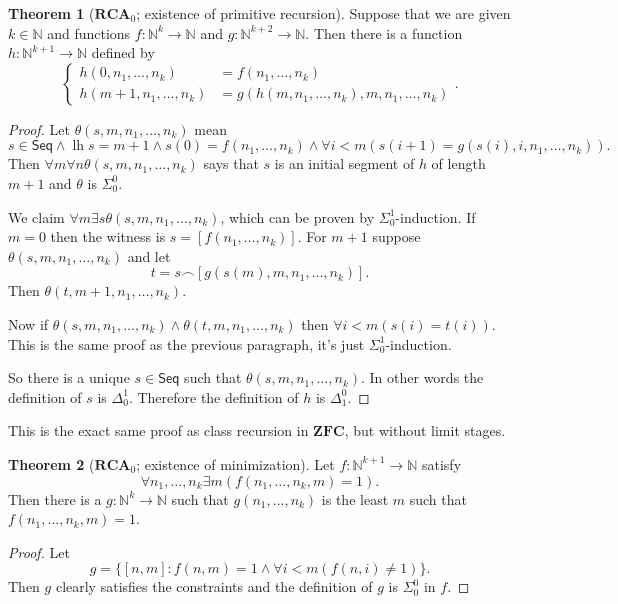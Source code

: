 \documentclass[12pt]{book}
\newcommand{\NN}{\mathbb{N}}
\newcommand{\Seq}{\mathsf{Seq}}
\DeclareMathOperator{\lh}{lh}
\newcommand{\RCA}{\mathbf{RCA}}
\theoremstyle{definition}
\newtheorem{theorem}{Theorem}[chapter]
\begin{document}
\begin{theorem}[$\RCA_0$; existence of primitive recursion]
Suppose that we are given $k \in \NN$ and functions $f: \NN^k \to \NN$ and $g: \NN^{k+2} \to \NN$.
Then there is a function $h: \NN^{k+1} \to \NN$ defined by
$$\begin{cases}
h(0, n_1, \dots, n_k) &= f(n_1, \dots, n_k) \\
h(m+1,n_1, \dots, n_k) &= g(h(m, n_1, \dots, n_k), m, n_1, \dots, n_k)
\end{cases}.$$
\end{theorem}
\begin{proof}
Let $\theta(s, m, n_1, \dots, n_k)$ mean
$$s \in \Seq \wedge \lh s = m + 1 \wedge s(0) = f(n_1, \dots, n_k) \wedge \forall i < m(s(i+1) = g(s(i), i, n_1, \dots, n_k)).$$
Then $\forall m \forall n \theta(s, m, n_1, \dots, n_k)$ says that $s$ is an initial segment of $h$ of length $m + 1$ and $\theta$ is $\Sigma_0^0$.

We claim $\forall m \exists s \theta(s, m, n_1, \dots, n_k)$, which can be proven by $\Sigma_0^1$-induction.
If $m = 0$ then the witness is $s = [f(n_1, \dots, n_k)]$.
For $m + 1$ suppose $\theta(s, m, n_1, \dots, n_k)$ and let
$$t = s \frown [g(s(m), m, n_1, \dots, n_k)].$$
Then $\theta(t, m + 1, n_1, \dots, n_k)$.

Now if $\theta(s, m, n_1, \dots, n_k) \wedge \theta(t, m, n_1, \dots, n_k)$ then $\forall i < m(s(i) = t(i))$.
This is the same proof as the previous paragraph, it's just $\Sigma_0^1$-induction.

So there is a unique $s \in \Seq$ such that $\theta(s, m, n_1, \dots, n_k)$.
In other words the definition of $s$ is $\Delta_0^1$. Therefore the definition of $h$ is $\Delta_1^0$.
\end{proof}

This is the exact same proof as class recursion in $\mathbf{ZFC}$, but without limit stages.

\begin{theorem}[$\RCA_0$; existence of minimization]
Let $f: \NN^{k+1} \to \NN$ satisfy
$$\forall n_1, \dots, n_k \exists m(f(n_1, \dots, n_k, m) = 1).$$
Then there is a $g: \NN^k \to \NN$ such that $g(n_1, \dots, n_k)$ is the least $m$ such that $f(n_1, \dots, n_k, m) = 1$.
\end{theorem}
\begin{proof}
Let
$$g = \{[n, m]: f(n, m) = 1 \wedge \forall i < m(f(n, i) \neq 1)\}.$$
Then $g$ clearly satisfies the constraints and the definition of $g$ is $\Sigma_0^0$ in $f$.
\end{proof}
\end{document}
